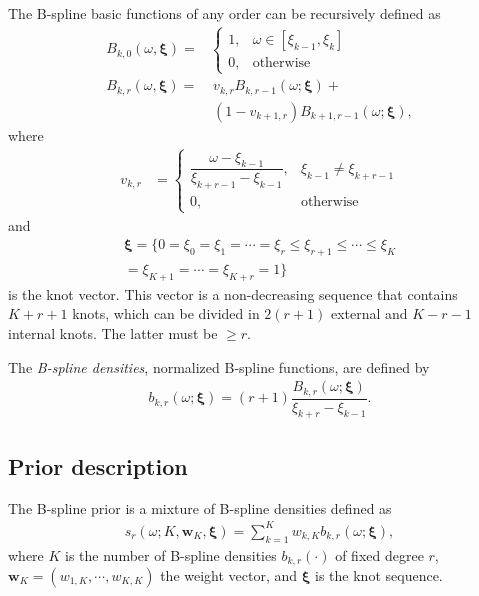 \documentclass[aps,reprint,amsmath,amssymb,showpacs,showkeys]{revtex4-1}%
\begin{document}
The B-spline basic functions of any order can be recursively defined as
\begin{align*}
	B_{k,0}(\omega, \bm{\xi})=&	
	\left\{
	\begin{array}{ll}
		1, & \omega \in [\xi_{k-1}, \xi_{k}] \\
		0, & \mbox{otherwise} 
	\end{array}
	\right.\\
	B_{k,r}(\omega, \bm{\xi}) = & \:v_{k,r}B_{k,r-1}(\omega; \bm{\xi}) + \\
	   & \: (1-v_{k+1,r})B_{k+1,r-1}(\omega; \bm{\xi}),	
\end{align*}
where	   
\begin{align*}	   
	v_{k,r}&=	
	\left\{
	\begin{array}{ll}
		\dfrac{\omega - \xi_{k-1}}{\xi_{k+r-1} - \xi_{k-1}}, & \xi_{k-1} \neq \xi_{k+r-1}\\
		0, & \mbox{otherwise} 
	\end{array}
	\right.
\end{align*}
and 
\begin{align*}
	\bm{\xi} = \{0 = \xi_0 = \xi_1 = \cdots = \xi_r \leq \xi_{r+1} \leq \cdots \leq \xi_{K}\\ = \xi_{K+1} = \cdots = \xi_{K+r} = 1 \}
\end{align*}
is the knot vector.  This vector is a non-decreasing sequence that contains $K+r+1$ knots, which can be divided in $2(r+1)$ external and $K-r-1$ internal knots.  The latter must be $\geq r$.

The \textit{B-spline densities}, normalized B-spline functions, are defined by
\begin{align*}
	b_{k,r}(\omega; \bm{\xi}) = \left(r+1\right) \dfrac{B_{k,r}(\omega;\bm{\xi})}{\xi_{k+r} - \xi_{k-1}}.
\end{align*}


\subsection*{Prior description}
The B-spline prior is a mixture of B-spline densities defined as
\begin{align}
s_r(\omega; K,\bm{w}_K, \bm{\xi}) = \sum_{k=1}^{K} w_{k,K} b_{k,r}(\omega;\bm{\xi}),
\label{eq:bs_prior}	
\end{align}
where $K$ is the number of B-spline densities  $b_{k,r}(\cdot)$ of fixed degree $r$, $\bm{w}_K=(w_{1,K},\cdots, w_{K,K})$ the weight vector, and $\bm{\xi}$ is the knot sequence.
\end{document}
